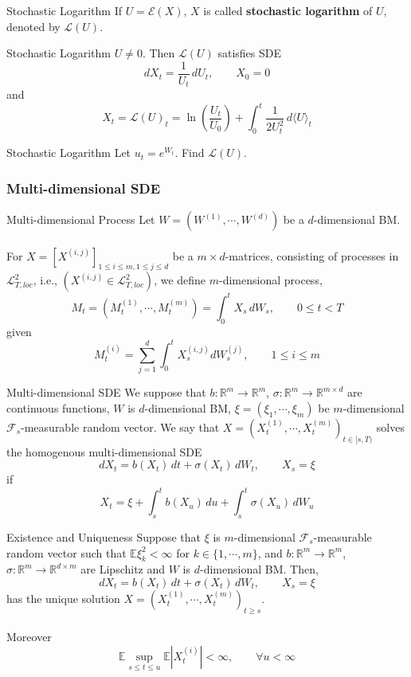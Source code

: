 \documentclass[12pt,a4paper]{article}
\newcommand{\R}{\mathbb{R}}
\newcommand{\E}{\mathbb{E}}
\begin{document}
    \pagebreak
    \begin{definition}{Stochastic Logarithm}{}
        If $U=\mathcal{E}(X)$, $X$ is called \textbf{stochastic logarithm} of $U$, denoted by $\mathcal{L}(U)$.
    \end{definition}
    \begin{theorem}{Stochastic Logarithm}{}
        $U\neq 0$. Then $\mathcal{L}(U)$ satisfies SDE
        $$
        dX_t = \frac{1}{U_t}\, dU_t,\qquad X_0=0
        $$
        and 
        $$X_t = \mathcal{L}(U)_t = \ln \left(\frac{U_t}{U_0}\right) +\int_0^t \frac{1}{2U_t^2}\, d\langle U\rangle_t$$
    \end{theorem}
    \begin{example}{Stochastic Logarithm}{}
        Let $u_t = e^{W_t}$. Find $\mathcal{L}(U)$.
    \end{example}
    \pagebreak
    \subsubsection{Multi-dimensional SDE}
    \begin{definition}{Multi-dimensional Process}{}
    Let $W = (W^{(1)},\cdots,W^{(d)})$ be a  $d$-dimensional BM.\\
    \\
    For $X = [X^{(i,j)}]_{1\le i\le m, 1\le j\le d}$ be a $m\times d$-matrices, consisting of processes in $\mathcal{L}^2_{T,loc}$, i.e., $(X^{(i,j)}\in \mathcal{L}^2_{T,loc})$, we define $m$-dimensional process,
    $$
    M_t = (M_t^{(1)},\cdots, M_{t}^{(m)}) = \int_0^t X_s\, dW_s,\qquad 0\le t<T
    $$
    given
    $$
    M_t^{(i)} = \sum_{j=1}^d \int_0^t X_s^{(i,j)} dW_s^{(j)},\qquad 1\le i\le m
    $$
    \end{definition}
    \begin{definition}{Multi-dimensional SDE}{}
        We suppose that $b: \R^m\to\R^m$, $\sigma: \R^m \to \R^{m\times d}$ are continuous functions, $W$ is $d$-dimensional BM, $\xi = (\xi_1,\cdots, \xi_m)$ be $m$-dimensional $\mathcal{F}_s$-measurable random vector. We say that $X = (X_t^{(1)},\cdots, X_{t}^{(m)})_{t\in[s,T)}$ solves the homogenous multi-dimensional SDE
        $$
        dX_t = b(X_t)\,dt + \sigma(X_t)\, dW_t,\qquad X_s = \xi
        $$
        if
        $$
        X_t = \xi  + \int_s^t b(X_u)\,du + \int_s^t \sigma(X_u)\, dW_u
        $$
    \end{definition}
    \begin{theorem}{Existence and Uniqueness}{}
        Suppose that $\xi$ is $m$-dimensional $\mathcal{F}_s$-measurable random vector such that $\E \xi_k^2<\infty$ for $k\in\{1,\cdots, m\}$, and $b:\R^m\to\R^m$, $\sigma:\R^m\to\R^{d\times m}$ are Lipschitz and $W$ is $d$-dimensional BM. Then,
        $$
        dX_t = b(X_t)\, dt + \sigma(X_t)\, dW_t,\qquad X_s = \xi
        $$
        has the unique solution $X = (X_t^{(1)},\cdots,X_t^{(m)})_{t\ge s}$.\\
        \\
        Moreover
        $$
        \E\sup_{s\le t\le u} \E|X_t^{(i)}|<\infty ,\qquad \forall u<\infty
        $$
    \end{theorem}
    \pagebreak
\end{document}
